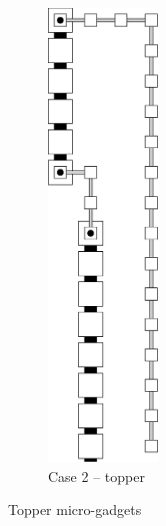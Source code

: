 \begin{figure}[H]
\begin{subfigure}[t]{0.32\textwidth}
        \includegraphics[width=0.32\textwidth]{digit_top_case2_digit2_topper}
        \caption{\label{fig:topper_case2} Case 2 -- topper}
    \end{subfigure}%
    \caption{\label{fig:topper_microgadgets} Topper micro-gadgets }
\end{figure}


